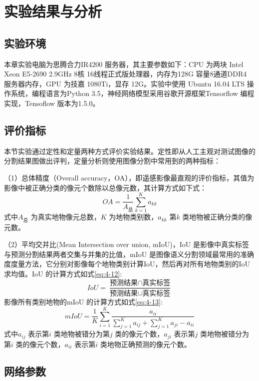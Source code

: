 \section{实验结果与分析}
\label{sec:third}
\subsection{实验环境}
\label{sec:third-1}
本章实验电脑为思腾合力IR4200 服务器，其主要参数如下：CPU 为两块 Intel Xeon E5-2690 2.9GHz 8核 16线程正式版处理器，内存为128G 容量8通道DDR4 服务器内存，GPU 为技嘉 1080Ti，显存 12G。实验中使用 Ubuntu 16.04 LTS 操作系统，编程语言为Python 3.5，神经网络模型采用谷歌开源框架Tensorflow 编程实现，Tensoflow 版本为1.5.0。

\subsection{评价指标}
\label{sec:third-2}
本节实验通过定性和定量两种方式评价实验结果。定性即从人工主观对测试图像的分割结果图做出评判，定量分析则使用图像分割中常用到的两种指标：

（1）总体精度（Overall accuracy，OA），即遥感影像最直观的评价指标，其值为影像中被正确分类的像元个数除以总像元数，其计算方式如下式：
\begin{equation}
  \label{eq:4-11}
  OA = \frac{1}{A_{\mbox{总}}}  \sum_{k=1}^K a_{kk}
\end{equation}
式中$A_{\mbox{总}}$ 为真实地物像元总数，$K$ 为地物类别数，$a_{kk}$ 第$k$ 类地物被正确分类的像元数。

（2）平均交并比(Mean Intersection over union, mIoU)，IoU 是影像中真实标签与预测分割结果两者交集与并集的比值，mIoU 是图像语义分割领域最常用的准确度度量方法，它分别对影像每个地物类别计算IoU，然后再对所有地物类别的IoU 求均值。IoU 的计算方式如式\ref{eq:4-12}:
\begin{equation}
  \label{eq:4-12}
  IoU = \frac{\mbox{预测结果} \cap \mbox{真实标签}}{\mbox{预测结果} \cup \mbox{真实标签}}
\end{equation}
影像所有类别地物的mIoU 的计算方式如式\ref{eq:4-13}:
\begin{equation}
  \label{eq:4-13}
  mIoU = \frac{1}{K}  \sum_{i=1}^K \frac{a_{ii}}{\sum_{j=1}^Ka_{ij} + \sum_{j=1}^Ka_{ji} -a_{ii}}
\end{equation}
式中$a_{ij}$ 表示第$i$ 类地物被错分为第$j$ 类的像元个数，$a_{ji} $ 表示第$j$ 类地物被错分为第$i$ 类的像元个数，$a_{ii}$ 表示第$i$ 类地物正确预测的像元个数。


\subsection{网络参数}
\label{sec:third-3}

